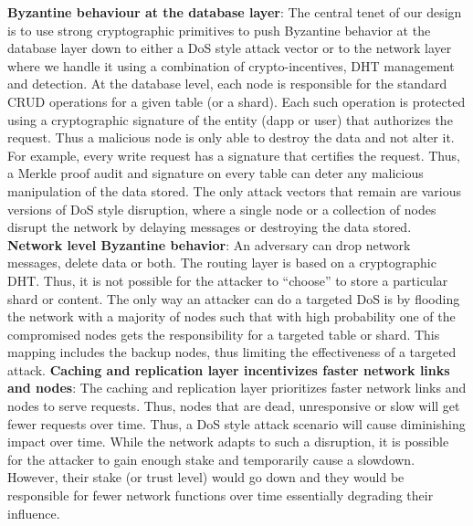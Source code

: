 \textbf{Byzantine behaviour at the database layer}: The central tenet of our design is to use strong cryptographic primitives to push Byzantine behavior at the database layer down to either a DoS style attack vector or to the network layer where we handle it using a combination of crypto-incentives, DHT management and detection. At the database level, each node is responsible for the standard CRUD operations for a given table (or a shard). Each such operation is protected using a cryptographic signature of the entity (dapp or user) that authorizes the request. Thus a malicious node is only able to destroy the data and not alter it. For example, every write request has a signature that certifies the request. Thus, a Merkle proof audit and signature on every table can deter any malicious manipulation of the data stored. The only attack vectors that remain are various versions of DoS style disruption, where a single node or a collection of nodes disrupt the network by delaying messages or destroying the data stored. 
\newline\newline
\textbf{Network level Byzantine behavior}: An adversary can drop network messages, delete data or both. The routing layer is based on a cryptographic DHT. Thus, it is not possible for the attacker to “choose” to store a particular shard or content. The only way an attacker can do a targeted DoS is by flooding the network with a majority of nodes such that with high probability one of the compromised nodes gets the responsibility for a targeted table or shard. This mapping includes the backup nodes, thus limiting the effectiveness of a targeted attack.
\newline\newline
\textbf{Caching and replication layer incentivizes faster network links and nodes}:
The caching and replication layer prioritizes faster network links and nodes to serve requests. Thus, nodes that are dead, unresponsive or slow will get fewer requests over time. Thus, a DoS style attack scenario will cause diminishing impact over time. While the network adapts to such a disruption, it is possible for the attacker to gain enough stake and temporarily cause a slowdown. However, their stake (or trust level) would go down and they would be responsible for fewer network functions over time essentially degrading their influence.	
\newline\newline
